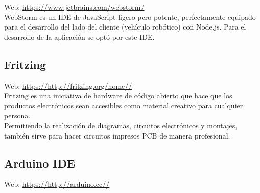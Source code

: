 Web: \url{https://www.jetbrains.com/webstorm/}\\

WebStorm es un IDE de JavaScript ligero pero potente, perfectamente equipado para el desarrollo del lado del cliente (vehículo robótico) con Node.js. Para el desarrollo de la aplicación se optó por este IDE. \\

\subsection{Fritzing}


Web: \url{https://http://fritzing.org/home//} \cite{website:1} \\

Fritzing es una iniciativa de hardware de código abierto que hace que los productos electrónicos sean accesibles como material creativo para cualquier persona.\\

Permitiendo la realización de diagramas, circuitos electrónicos y montajes, también sirve para hacer circuitos impresos PCB de manera profesional.

\subsection{Arduino IDE}


Web: \url{https://http://arduino.cc//} \cite{website:1} \\

